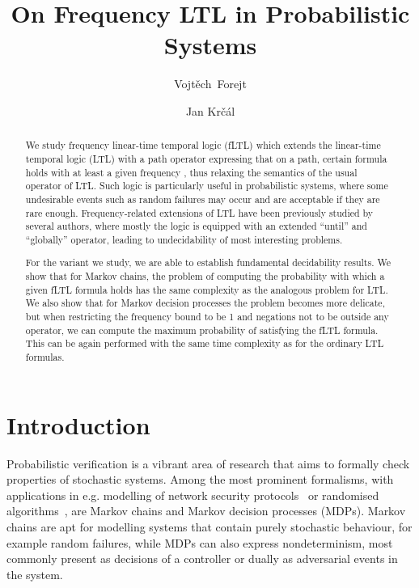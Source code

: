 \documentclass[a4paper,UKenglish]{lipics}
\begin{document}
\title{On Frequency LTL in Probabilistic Systems}

\author[1]{Vojt\v{e}ch~Forejt}
\author[2]{Jan Kr\v{c}\'al}





\maketitle

\begin{abstract}
We study frequency linear-time temporal logic (fLTL) which extends the
linear-time temporal logic (LTL) with a path operator 
expressing that on a path, certain formula holds with at least a given frequency , thus relaxing
the semantics of the usual  operator of LTL. Such logic is particularly useful
in probabilistic systems, where some undesirable events such as random failures may occur
and are acceptable if they are rare enough.
Frequency-related extensions of LTL have been previously studied by several authors, where mostly
the logic is equipped with an extended ``until'' and ``globally'' operator, leading to undecidability
of most interesting problems. 

For the variant we study, we are able to establish fundamental decidability results. We show that for Markov chains,
the problem of computing the probability with which a given fLTL formula holds has the same complexity
as the analogous problem for LTL. We also show that for Markov decision processes the problem becomes
more delicate, but when restricting the frequency bound  to be 1 and negations not to be outside any  operator, we can
compute the maximum probability of satisfying the fLTL formula. This can be again performed with the same time
complexity as for the ordinary LTL formulas.
\end{abstract}

\section{Introduction}

Probabilistic verification is a vibrant area of research that aims to formally check properties of stochastic systems. Among the most
prominent formalisms, with applications in e.g. modelling of network security protocols~\cite{Shm04} or
randomised algorithms~\cite{KNP12a}, are Markov chains and Markov decision processes (MDPs). Markov chains are
apt for modelling systems that contain 
purely stochastic behaviour,
for example random failures,
while MDPs can also express nondeterminism,
most commonly present as decisions of a controller or dually as adversarial events in the system.
\end{document}
